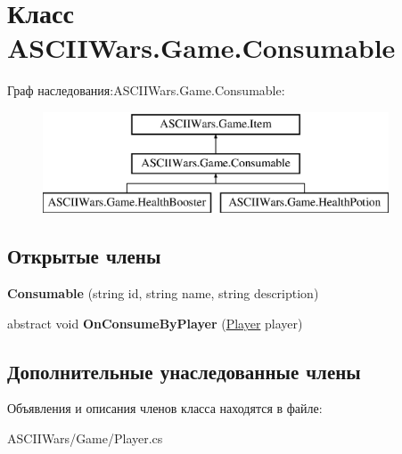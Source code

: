 \hypertarget{class_a_s_c_i_i_wars_1_1_game_1_1_consumable}{}\section{Класс A\+S\+C\+I\+I\+Wars.\+Game.\+Consumable}
\label{class_a_s_c_i_i_wars_1_1_game_1_1_consumable}
Граф наследования\+:A\+S\+C\+I\+I\+Wars.\+Game.\+Consumable\+:\begin{figure}[H]
\begin{center}
\leavevmode
\includegraphics[height=3.000000cm]{class_a_s_c_i_i_wars_1_1_game_1_1_consumable}
\end{center}
\end{figure}
\subsection*{Открытые члены}
\begin{DoxyCompactItemize}
\item 
\hypertarget{class_a_s_c_i_i_wars_1_1_game_1_1_consumable_aa445dfd287fc22cfb76b133614fec0c2}{}\label{class_a_s_c_i_i_wars_1_1_game_1_1_consumable_aa445dfd287fc22cfb76b133614fec0c2} 
{\bfseries Consumable} (string id, string name, string description)
\item 
\hypertarget{class_a_s_c_i_i_wars_1_1_game_1_1_consumable_a6aac67fe076ca39cb850e3720461fff8}{}\label{class_a_s_c_i_i_wars_1_1_game_1_1_consumable_a6aac67fe076ca39cb850e3720461fff8} 
abstract void {\bfseries On\+Consume\+By\+Player} (\hyperlink{class_a_s_c_i_i_wars_1_1_game_1_1_player}{Player} player)
\end{DoxyCompactItemize}
\subsection*{Дополнительные унаследованные члены}


Объявления и описания членов класса находятся в файле\+:\begin{DoxyCompactItemize}
\item 
A\+S\+C\+I\+I\+Wars/\+Game/Player.\+cs\end{DoxyCompactItemize}
